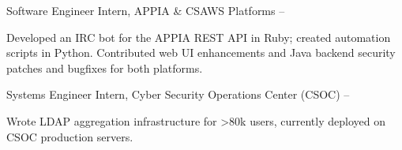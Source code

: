 \GapNoBreak
\hspace{1em} 
Software Engineer Intern, APPIA \& CSAWS Platforms
\hfill
{} --
\begin{detail}
\SubBulletItem
Developed an IRC bot for the APPIA REST API in Ruby; created automation scripts in Python.
\SubBulletItem
Contributed web UI enhancements and Java backend security patches and bugfixes for both platforms.
\end{detail}

\GapNoBreak
\hspace{1em} 
Systems Engineer Intern, Cyber Security Operations Center (CSOC)
\hfill
{} --
\begin{detail}
\SubBulletItem
Wrote LDAP aggregation infrastructure for >80k users, currently deployed on CSOC production servers.
\end{detail}